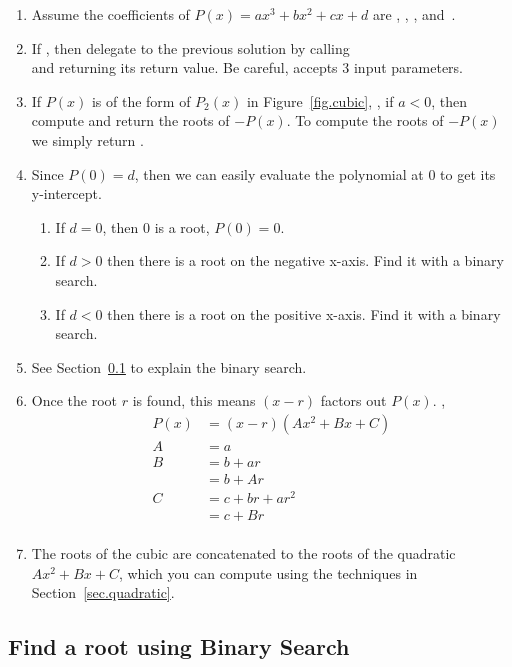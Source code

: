\begin{enumerate}
\item Assume the coefficients of $P(x) = a x^3 + b x^2 + c x + d$ are
  ,  ,  ,  and~.
\item If , then delegate to the previous solution by
  calling \\
   and returning its return
  value.  Be careful,  accepts 3 input
  parameters.
\item If $P(x)$ is of the form of $P_2(x)$ in Figure~\ref{fig.cubic},
  \ie, if $a<0$, then compute and return the roots of $-P(x)$.  To
  compute the roots of $-P(x)$ we simply return
  .
\item Since $P(0) = d$, then we can easily evaluate the polynomial at 0 to get its y-intercept.
  \begin{enumerate}
  \item If $d = 0$, then 0 is a root, $P(0) = 0$.
  \item If $d>0$ then there is a root on the negative x-axis.  Find it with a binary search.
  \item If $d<0$ then there is a root on the positive x-axis. Find it with a binary search.
  \end{enumerate}
\item See Section~\ref{sec.binary.search} to explain the binary search.
\item Once the root $r$ is found, this means $(x-r)$ factors out $P(x)$. \Ie,
  \begin{align*}
    P(x) &= (x-r)(A x^2 + B x + C)\\ 
    A &= a\\
    B &= b + a r \\
    &= b + A r\\
    C &= c + b r + a r^2 \\
    &=
    c + B r\\
  \end{align*}
\item The roots of the cubic are \code{[r]} concatenated to the roots of the quadratic 
  $A x^2 + B x + C$, which you can compute using the techniques in Section~\ref{sec.quadratic}.
\end{enumerate}


\subsection{Find a root using Binary Search}
\label{sec.binary.search}


